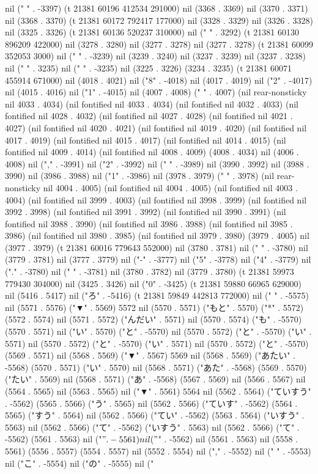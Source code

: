 nil ("%
" . -3397) (t 21381 60196 412534 291000) nil (3368 . 3369) nil (3370 . 3371) nil (3368 . 3370) (t 21381 60172 792417 177000) nil (3328 . 3329) nil (3326 . 3328) nil (3325 . 3326) (t 21381 60136 520237 310000) nil ("
" . 3292) (t 21381 60130 896209 422000) nil (3278 . 3280) nil (3277 . 3278) nil (3277 . 3278) (t 21381 60099 352053 3000) nil ("
" . -3239) nil (3239 . 3240) nil (3237 . 3239) nil (3237 . 3238) nil ("
" . 3235) nil ("
" . -3235) nil (3225 . 3226) (3234 . 3235) (t 21381 60071 455914 671000) nil (4018 . 4021) nil ("8" . -4018) nil (4017 . 4019) nil ("2" . -4017) nil (4015 . 4016) nil ("1" . -4015) nil (4007 . 4008) ("  " . 4007) (nil rear-nonsticky nil 4033 . 4034) (nil fontified nil 4033 . 4034) (nil fontified nil 4032 . 4033) (nil fontified nil 4028 . 4032) (nil fontified nil 4027 . 4028) (nil fontified nil 4021 . 4027) (nil fontified nil 4020 . 4021) (nil fontified nil 4019 . 4020) (nil fontified nil 4017 . 4019) (nil fontified nil 4015 . 4017) (nil fontified nil 4014 . 4015) (nil fontified nil 4009 . 4014) (nil fontified nil 4008 . 4009) (4008 . 4034) nil (4006 . 4008) nil ("," . -3991) nil ("2" . -3992) nil (" " . -3989) nil (3990 . 3992) nil (3988 . 3990) nil (3986 . 3988) nil ("1" . -3986) nil (3978 . 3979) ("  " . 3978) (nil rear-nonsticky nil 4004 . 4005) (nil fontified nil 4004 . 4005) (nil fontified nil 4003 . 4004) (nil fontified nil 3999 . 4003) (nil fontified nil 3998 . 3999) (nil fontified nil 3992 . 3998) (nil fontified nil 3991 . 3992) (nil fontified nil 3990 . 3991) (nil fontified nil 3988 . 3990) (nil fontified nil 3986 . 3988) (nil fontified nil 3985 . 3986) (nil fontified nil 3980 . 3985) (nil fontified nil 3979 . 3980) (3979 . 4005) nil (3977 . 3979) (t 21381 60016 779643 552000) nil (3780 . 3781) nil (" " . -3780) nil (3779 . 3781) nil (3777 . 3779) nil ("-" . -3777) nil ("5" . -3778) nil ("4" . -3779) nil ("." . -3780) nil (" " . -3781) nil (3780 . 3782) nil (3779 . 3780) (t 21381 59973 779430 304000) nil (3425 . 3426) nil ("0" . -3425) (t 21381 59880 66965 629000) nil (5416 . 5417) nil ("ろ" . -5416) (t 21381 59849 442813 772000) nil (" " . -5575) nil (5571 . 5576) ("▼" . 5569) 5572 nil (5570 . 5571) ("もと" . 5570) ("*" . 5572) (5572 . 5574) nil (5571 . 5572) ("んだい" . 5571) nil (5570 . 5574) ("も" . -5570) (5570 . 5571) nil ("い" . 5570) ("と" . -5570) nil (5570 . 5572) ("と" . -5570) ("い" . 5571) nil (5570 . 5572) ("と" . -5570) ("い" . 5571) nil (5570 . 5572) ("と" . -5570) (5569 . 5571) nil (5568 . 5569) ("▼" . 5567) 5569 nil (5568 . 5569) ("あたい" . -5568) (5570 . 5571) ("い" . 5570) nil (5568 . 5571) ("あた" . -5568) (5569 . 5570) ("たい" . 5569) nil (5568 . 5571) ("あ" . -5568) (5567 . 5569) nil (5566 . 5567) nil (5564 . 5565) nil (5563 . 5565) nil ("▼" . 5561) 5564 nil (5562 . 5564) ("ていすう" . -5562) (5565 . 5566) ("う" . 5565) nil (5562 . 5566) ("ていす" . -5562) (5564 . 5565) ("すう" . 5564) nil (5562 . 5566) ("てい" . -5562) (5563 . 5564) ("いすう" . 5563) nil (5562 . 5566) ("て" . -5562) ("いすう" . 5563) nil (5562 . 5566) ("て" . -5562) (5561 . 5563) nil ("$" . -5561) nil ("$" . -5562) nil (5561 . 5563) nil (5558 . 5561) (5556 . 5557) (5554 . 5557) nil (5552 . 5554) nil ("," . -5552) nil (" " . -5553) nil ("こ" . -5554) nil ("の" . -5555) nil ("
